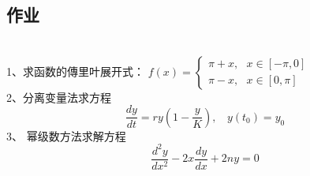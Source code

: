 \subsection{作业}
~~ \hspace*{\fill} \\ 
1、求函数的傳里叶展开式：
$\displaystyle f(x)=\begin{cases}
	\pi +x , ~~~ x \in [-\pi, 0] \\
	\pi -x ,~~~ x \in   [0, \pi] 
\end{cases}$ \\
2、分离变量法求方程\\
\begin{equation*}
	\frac{dy}{dt}	=  r y (1-\frac{y}{K}), ~~~~ y(t_0) = y_0
\end{equation*}
3、	幂级数方法求解方程\\
\begin{equation*}
	\frac{d^2 y}{d x^2} -2x \frac{d y}{d x} +2n y =0 
\end{equation*}     